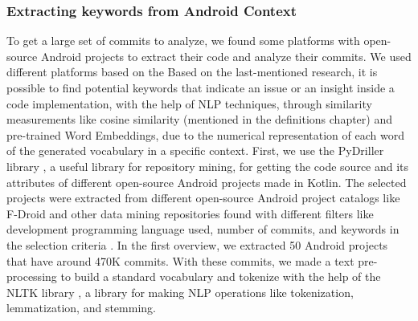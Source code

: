 \subsubsection{Extracting keywords from Android Context}
To get a large set of commits to analyze, we found some platforms with open-source Android projects to extract their code and analyze their commits. We used different platforms based on the
Based on the last-mentioned research, it is possible to find potential keywords that indicate an issue or an insight inside a code implementation, with the help of NLP techniques, through similarity measurements like cosine similarity (mentioned in the definitions chapter) and pre-trained Word Embeddings, due to the numerical representation of each word of the generated vocabulary in a specific context. First, we use the PyDriller library \citet{pydriller}, a useful library for repository mining, for getting the code source and its attributes of different open-source Android projects made in Kotlin. The selected projects were extracted from different open-source Android project catalogs like F-Droid and other data mining repositories found with different filters like development programming language used, number of commits, and keywords in the selection criteria \citet{fdroid,repository_mining}. In the first overview, we extracted 50 Android projects that have around 470K commits. With these commits, we made a text pre-processing to build a standard vocabulary and tokenize with the help of the NLTK library \citet{nltk}, a library for making NLP operations like tokenization, lemmatization, and stemming.

